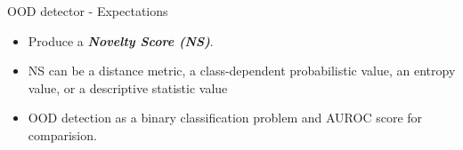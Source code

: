 \documentclass[10pt, aspectratio=169]{beamer}
\begin{document}
\begin{frame}{OOD detector - Expectations}
    \begin{itemize}
        \item Produce a \textbf{\textit{Novelty Score (NS)}}. 
        \item NS can be a distance metric, a class-dependent probabilistic value, an entropy value, or a descriptive statistic value
        \item OOD detection as a binary classification problem and AUROC score for comparision.
    \end{itemize}
        
    
    

    
    


\end{frame}
\end{document}
